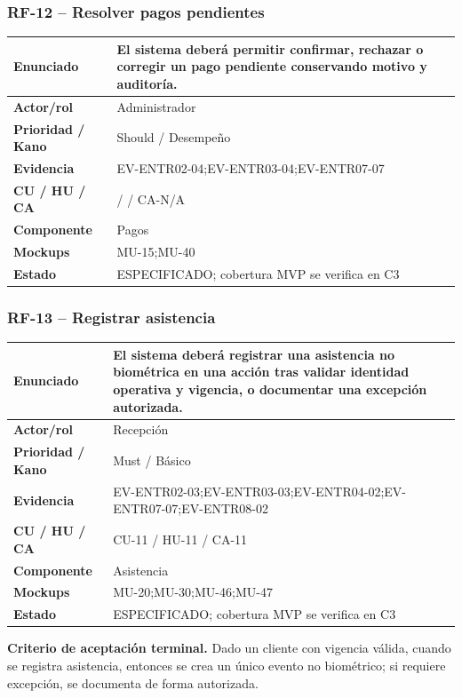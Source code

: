 \documentclass[11pt,a4paper,twoside]{article}
\begin{document}
\subsubsection{RF-12 -- Resolver pagos pendientes}
\begin{tabularx}{\textwidth}{|>{\bfseries}p{3.2cm}|X|}\hline
Enunciado & El sistema deberá permitir confirmar, rechazar o corregir un pago pendiente conservando motivo y auditoría. \\ \hline
Actor/rol & Administrador \\ \hline
Prioridad / Kano & Should / Desempeño \\ \hline
Evidencia & EV-ENTR02-04;EV-ENTR03-04;EV-ENTR07-07 \\ \hline
CU / HU / CA &  /  / CA-N/A \\ \hline
Componente & Pagos \\ \hline
Mockups & MU-15;MU-40 \\ \hline
Estado & ESPECIFICADO; cobertura MVP se verifica en C3 \\ \hline
\end{tabularx}
\subsubsection{RF-13 -- Registrar asistencia}
\begin{tabularx}{\textwidth}{|>{\bfseries}p{3.2cm}|X|}\hline
Enunciado & El sistema deberá registrar una asistencia no biométrica en una acción tras validar identidad operativa y vigencia, o documentar una excepción autorizada. \\ \hline
Actor/rol & Recepción \\ \hline
Prioridad / Kano & Must / Básico \\ \hline
Evidencia & EV-ENTR02-03;EV-ENTR03-03;EV-ENTR04-02;EV-ENTR07-07;EV-ENTR08-02 \\ \hline
CU / HU / CA & CU-11 / HU-11 / CA-11 \\ \hline
Componente & Asistencia \\ \hline
Mockups & MU-20;MU-30;MU-46;MU-47 \\ \hline
Estado & ESPECIFICADO; cobertura MVP se verifica en C3 \\ \hline
\end{tabularx}
\textbf{Criterio de aceptación terminal.} Dado un cliente con vigencia válida, cuando se registra asistencia, entonces se crea un único evento no biométrico; si requiere excepción, se documenta de forma autorizada.
\end{document}
